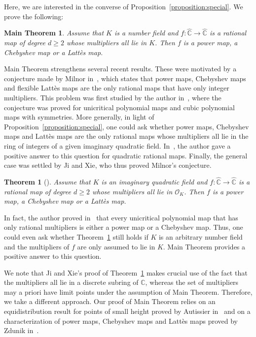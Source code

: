 \documentclass[11pt]{article}
\theoremstyle{plain}
\newtheorem*{maintheorem}{Main Theorem}
\newtheorem{theorem}{Theorem}
\theoremstyle{definition}
\theoremstyle{remark}
\begin{document}
Here, we are interested in the converse of Proposition~\ref{proposition:special}. We prove the following:

\begin{maintheorem}
Assume that $K$ is a number field and $f \colon \widehat{\mathbb{C}} \to \widehat{\mathbb{C}}$ is a rational map of degree $d \geq 2$ whose multipliers all lie in $K$. Then $f$ is a power map, a Chebyshev map or a Lattès map.
\end{maintheorem}

Main Theorem strengthens several recent results. These were motivated by a conjecture made by Milnor in~\cite{M2006}, which states that power maps, Chebyshev maps and flexible Lattès maps are the only rational maps that have only integer multipliers. This problem was first studied by the author in~\cite{H2021}, where the conjecture was proved for unicritical polynomial maps and cubic polynomial maps with symmetries. More generally, in light of Proposition~\ref{proposition:special}, one could ask whether power maps, Chebyshev maps and Lattès maps are the only rational maps whose multipliers all lie in the ring of integers of a given imaginary quadratic field. In~\cite{H2022}, the author gave a positive answer to this question for quadratic rational maps. Finally, the general case was settled by Ji and Xie, who thus proved Milnor's conjecture.

\begin{theorem}[{\cite[Th.\,1.13]{JX2022}}]
\label{theorem:milnor}
Assume that $K$ is an imaginary quadratic field and $f \colon \widehat{\mathbb{C}} \to \widehat{\mathbb{C}}$ is a rational map of degree $d \geq 2$ whose multipliers all lie in $\mathcal{O}_{K}$. Then $f$ is a power map, a Chebyshev map or a Lattès map.
\end{theorem}

In fact, the author proved in~\cite{H2021} that every unicritical polynomial map that has only rational multipliers is either a power map or a Chebyshev map. Thus, one could even ask whether Theorem~\ref{theorem:milnor} still holds if $K$ is an arbitrary number field and the multipliers of $f$ are only assumed to lie in $K$. Main Theorem provides a positive answer to this question.

We note that Ji and Xie's proof of Theorem~\ref{theorem:milnor} makes crucial use of the fact that the multipliers all lie in a discrete subring of $\mathbb{C}$, whereas the set of multipliers may a priori have limit points under the assumption of Main Theorem. Therefore, we take a different approach. Our proof of Main Theorem relies on an equidistribution result for points of small height proved by Autissier in~\cite{A2001} and on a characterization of power maps, Chebyshev maps and Lattès maps proved by Zdunik in~\cite{Z2014}.
\end{document}
